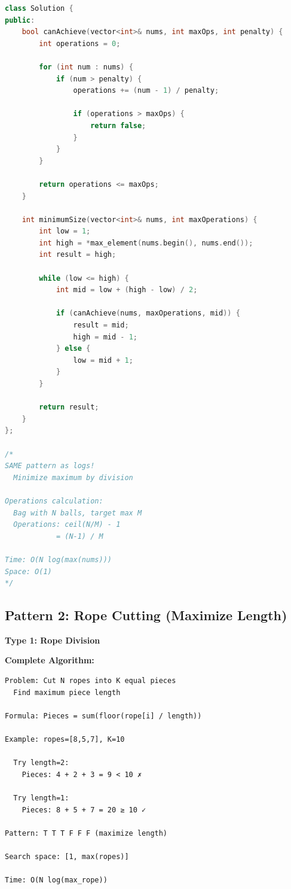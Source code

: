 \documentclass[11pt,a4paper,oneside]{book}
\begin{document}
\begin{lstlisting}[language=C++, caption=Complete Wood Cutting Solutions]
class Solution {
public:
    bool canAchieve(vector<int>& nums, int maxOps, int penalty) {
        int operations = 0;
        
        for (int num : nums) {
            if (num > penalty) {
                operations += (num - 1) / penalty;
                
                if (operations > maxOps) {
                    return false;
                }
            }
        }
        
        return operations <= maxOps;
    }
    
    int minimumSize(vector<int>& nums, int maxOperations) {
        int low = 1;
        int high = *max_element(nums.begin(), nums.end());
        int result = high;
        
        while (low <= high) {
            int mid = low + (high - low) / 2;
            
            if (canAchieve(nums, maxOperations, mid)) {
                result = mid;
                high = mid - 1;
            } else {
                low = mid + 1;
            }
        }
        
        return result;
    }
};

/*
SAME pattern as logs!
  Minimize maximum by division
  
Operations calculation:
  Bag with N balls, target max M
  Operations: ceil(N/M) - 1
            = (N-1) / M

Time: O(N log(max(nums)))
Space: O(1)
*/
\end{lstlisting}

\subsection{Pattern 2: Rope Cutting (Maximize Length)}

\begin{tcolorbox}[
    enhanced,breakable,
    colback=lightgray,
    colframe=accentorange,
    boxrule=2pt,
    arc=4mm,
    title=\textbf{Complete Rope Cutting Algorithms}
]
\textbf{Type 1: Rope Division}

\textbf{Complete Algorithm:}
\begin{verbatim}
Problem: Cut N ropes into K equal pieces
  Find maximum piece length
  
Formula: Pieces = sum(floor(rope[i] / length))

Example: ropes=[8,5,7], K=10
  
  Try length=2:
    Pieces: 4 + 2 + 3 = 9 < 10 ✗
  
  Try length=1:
    Pieces: 8 + 5 + 7 = 20 ≥ 10 ✓

Pattern: T T T F F F (maximize length)

Search space: [1, max(ropes)]

Time: O(N log(max_rope))
\end{verbatim}
\end{tcolorbox}
\end{document}
